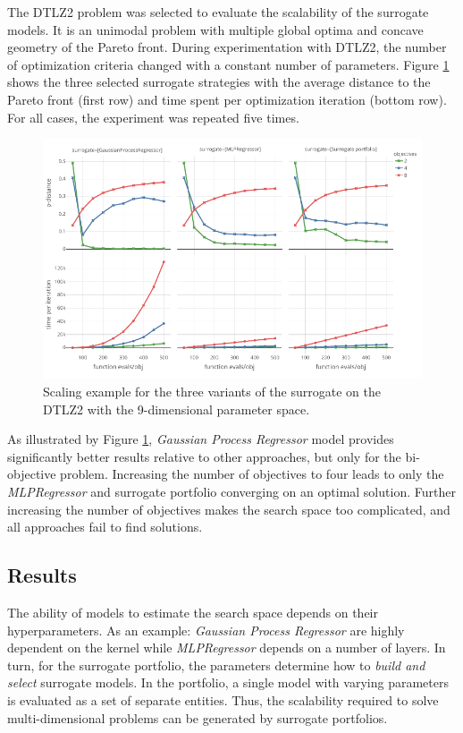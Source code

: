     The DTLZ2 problem was selected to evaluate the scalability of the surrogate models. It is an unimodal problem with multiple global optima and concave geometry of the Pareto front. 
    During experimentation with DTLZ2, the number of optimization criteria changed with a constant number of parameters. Figure \ref{fig:scale_dtlz2} shows the three selected surrogate strategies with the average distance to the Pareto front (first row) and time spent per optimization iteration (bottom row). For all cases, the experiment was repeated five times. 

        \begin{figure}[h]
            \centering
            \includegraphics[width=\textwidth]{content/images/scale_dtlz2}
            \caption[Scaling example for the three variants of the surrogate on the DTLZ2.]{Scaling example for the three variants of the surrogate on the DTLZ2 with the 9-dimensional parameter space.}
            \label{fig:scale_dtlz2}    
        \end{figure}

    As illustrated by Figure \ref{fig:scale_dtlz2}, \emph{Gaussian Process Regressor} model provides significantly better results relative to other approaches, but only for the bi-objective problem. Increasing the number of objectives to four leads to only the \emph{MLPRegressor} and surrogate portfolio converging on an optimal solution. Further increasing the number of objectives makes the search space too complicated, and all approaches fail to find solutions.
    
    \subsection*{Results}
    The ability of models to estimate the search space depends on their hyperparameters. As an example: \emph{Gaussian Process Regressor} are highly dependent on the kernel while \emph{MLPRegressor} depends on a number of layers.
    In turn, for the surrogate portfolio, the parameters determine how to \emph{build and select} surrogate models. In the portfolio, a single model with varying parameters is evaluated as a set of separate entities. Thus, the scalability required to solve multi-dimensional problems can be generated by surrogate portfolios.


